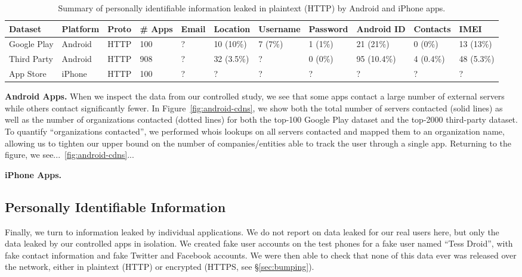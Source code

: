 \begin{table}[t]
    \begin{tabular}{l|l|l|l|l|l|l|l|l|l|l}
       Dataset&Platform&Proto&\# Apps&Email&Location&Username&Password&Android ID&Contacts&IMEI\\
       \hline
       Google Play&Android&HTTP&100&?&10 (10\%)&7 (7\%)&1 (1\%)&21 (21\%)&0 (0\%)&13 (13\%)\\
       \hline
       Third Party&Android&HTTP&908&?&32 (3.5\%)&?&0 (0\%)&95 (10.4\%)&4 (0.4\%)&48 (5.3\%)\\
       \hline
       App Store&iPhone&HTTP&100&?&?&?&?&?&?&?\\
    \end{tabular}
    \caption{\label{tbl:pii}Summary of personally identifiable information leaked in plaintext (HTTP) by Android and iPhone apps.}
  \end{table}
  

  {\bf Android Apps.}
  When we inspect the data from our controlled study, we see that some apps contact a large number of external servers while others contact significantly fewer.
  In Figure~\ref{fig:android-cdns}, we show both the total number of servers contacted (solid lines) as well as the number of organizations contacted (dotted lines) for both the top-100 Google Play dataset and the top-2000 third-party dataset.
  To quantify ``organizations contacted'', we performed whois lookups on all servers contacted and mapped them to an organization name, allowing us to tighten our upper bound on the number of companies/entities able to track the user through a single app.
  Returning to the figure, we see...~\ref{fig:android-cdns}...


  {\bf iPhone Apps.}

\subsection{Personally Identifiable Information}
 
  Finally, we turn to information leaked by individual applications. We do not report on data leaked for our real users here, but only the data leaked by our controlled apps in isolation.
  We created fake user accounts on the test phones for a fake user named ``Tess Droid'', with fake contact information and fake Twitter and Facebook accounts. 
  We were then able to check that none of this data ever was released over the network, either in plaintext (HTTP) or encrypted (HTTPS, see \S\ref{sec:bumping}).
  
